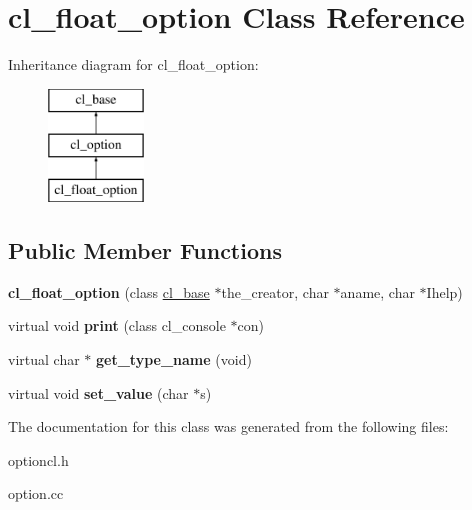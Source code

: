 \hypertarget{classcl__float__option}{
\section{cl\_\-float\_\-option Class Reference}
\label{classcl__float__option}
}
Inheritance diagram for cl\_\-float\_\-option:\begin{figure}[H]
\begin{center}
\leavevmode
\includegraphics[height=3.000000cm]{classcl__float__option}
\end{center}
\end{figure}
\subsection*{Public Member Functions}
\begin{DoxyCompactItemize}
\item 
\hypertarget{classcl__float__option_a097eb653d4d6b14ff488467de9bb06a4}{
{\bfseries cl\_\-float\_\-option} (class \hyperlink{classcl__base}{cl\_\-base} $\ast$the\_\-creator, char $\ast$aname, char $\ast$Ihelp)}
\label{classcl__float__option_a097eb653d4d6b14ff488467de9bb06a4}

\item 
\hypertarget{classcl__float__option_a9c3c7793d5fe36c996340855cb6af6cc}{
virtual void {\bfseries print} (class cl\_\-console $\ast$con)}
\label{classcl__float__option_a9c3c7793d5fe36c996340855cb6af6cc}

\item 
\hypertarget{classcl__float__option_ac469d0cd98a4aedcb2eabdf7d84e577e}{
virtual char $\ast$ {\bfseries get\_\-type\_\-name} (void)}
\label{classcl__float__option_ac469d0cd98a4aedcb2eabdf7d84e577e}

\item 
\hypertarget{classcl__float__option_a3a0677e34a43913f3796d977a8bf67c3}{
virtual void {\bfseries set\_\-value} (char $\ast$s)}
\label{classcl__float__option_a3a0677e34a43913f3796d977a8bf67c3}

\end{DoxyCompactItemize}


The documentation for this class was generated from the following files:\begin{DoxyCompactItemize}
\item 
optioncl.h\item 
option.cc\end{DoxyCompactItemize}

